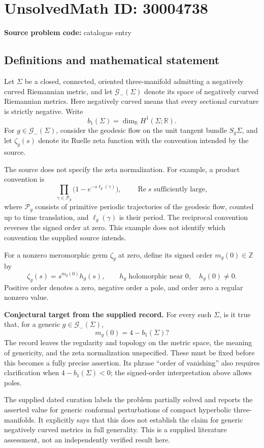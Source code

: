\documentclass[11pt]{article}
\newcommand{\Z}{\mathbb{Z}}
\newcommand{\R}{\mathbb{R}}
\begin{document}
\section*{UnsolvedMath ID: 30004738}
\textbf{Source problem code:} catalogue entry
\subsection{Definitions and mathematical statement}
Let \(\Sigma\) be a closed, connected, oriented three-manifold admitting a negatively curved Riemannian metric, and let \(\mathcal G_-(\Sigma)\) denote its space of negatively curved Riemannian metrics. Here negatively curved means that every sectional curvature is strictly negative. Write
\[
b_1(\Sigma)=\dim_{\R}H^1(\Sigma;\R).
\]
For \(g\in\mathcal G_-(\Sigma)\), consider the geodesic flow on the unit tangent bundle \(S_g\Sigma\), and let \(\zeta_g(s)\) denote its Ruelle zeta function with the convention intended by the source.

The source does not specify the zeta normalization. For example, a product convention is
\[
\prod_{\gamma\in\mathcal P_g}\bigl(1-e^{-s\ell_g(\gamma)}\bigr),
\qquad \operatorname{Re}s\text{ sufficiently large},
\]
where \(\mathcal P_g\) consists of primitive periodic trajectories of the geodesic flow, counted up to time translation, and \(\ell_g(\gamma)\) is their period. The reciprocal convention reverses the signed order at zero. This example does not identify which convention the supplied source intends.

For a nonzero meromorphic germ \(\zeta_g\) at zero, define its signed order \(m_g(0)\in\Z\) by
\[
\zeta_g(s)=s^{m_g(0)}h_g(s),\qquad h_g\text{ holomorphic near }0,\quad h_g(0)\ne0.
\]
Positive order denotes a zero, negative order a pole, and order zero a regular nonzero value.

\textbf{Conjectural target from the supplied record.} For every such \(\Sigma\), is it true that, for a generic \(g\in\mathcal G_-(\Sigma)\),
\[
m_g(0)=4-b_1(\Sigma)?
\]
The record leaves the regularity and topology on the metric space, the meaning of genericity, and the zeta normalization unspecified. These must be fixed before this becomes a fully precise assertion. Its phrase ``order of vanishing'' also requires clarification when \(4-b_1(\Sigma)<0\); the signed-order interpretation above allows poles.

The supplied dated curation labels the problem partially solved and reports the asserted value for generic conformal perturbations of compact hyperbolic three-manifolds. It explicitly says that this does not establish the claim for generic negatively curved metrics in full generality. This is a supplied literature assessment, not an independently verified result here.
\end{document}
